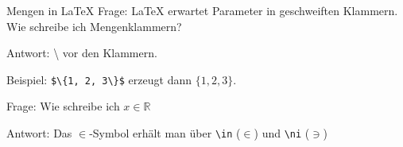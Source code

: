 \begin{frame}[fragile]{Mengen in \LaTeX{}}
Frage: \LaTeX{} erwartet Parameter in geschweiften Klammern. Wie schreibe ich Mengenklammern? 

\medskip\pause
Antwort: \textbackslash{} vor den Klammern. 

\medskip\pause
Beispiel: \verb+$\{1, 2, 3\}$+ erzeugt dann $\{1, 2, 3\}$.

\medskip\pause
Frage: Wie schreibe ich $x\in\mathbb{R}$

\medskip\pause
Antwort: Das $\in$-Symbol erhält man über \verb+\in+ ($\in$) und \verb+\ni+ ($\ni$)
\end{frame}